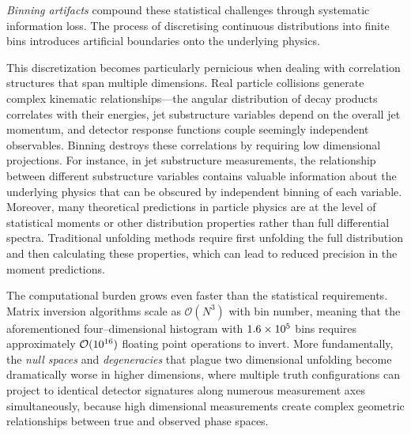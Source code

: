             \emph{Binning artifacts} compound these statistical challenges through systematic information loss.
            The process of discretising continuous distributions into finite bins introduces artificial boundaries  onto the underlying physics.
            
            This discretization becomes particularly pernicious when dealing with correlation structures that span multiple dimensions.
            Real particle collisions generate complex kinematic relationships---the angular distribution of decay products correlates with their energies, jet substructure variables depend on the overall jet momentum, and detector response functions couple seemingly independent observables.
            Binning destroys these correlations by requiring low dimensional projections.
            For instance, in jet substructure measurements, the relationship between different substructure variables contains valuable information about the underlying physics that can be obscured by independent binning of each variable.
            Moreover, many theoretical predictions in particle physics are at the level of statistical moments or other distribution properties rather than full differential spectra.
            Traditional unfolding methods require first unfolding the full distribution and then calculating these properties, which can lead to reduced precision in the moment predictions.
    
            The computational burden grows even faster than the statistical requirements.
            Matrix inversion algorithms scale as \(\mathcal O(N^3)\) with bin number, meaning that the aforementioned four--dimensional histogram with \(\num{1.6d5}\) bins requires approximately \(\mathcal{O}(\num{d16})\) floating point operations to invert.
            More fundamentally, the \emph{null spaces} and \emph{degeneracies} that plague two dimensional unfolding become dramatically worse in higher dimensions, where multiple truth configurations can project to identical detector signatures along numerous measurement axes simultaneously, because high dimensional measurements create complex geometric relationships between true and observed phase spaces.

